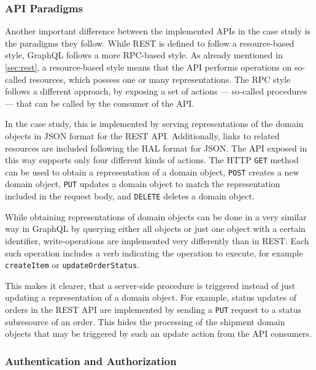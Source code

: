 \subsubsection{\acs{API} Paradigms}

Another important difference between the implemented \acp{API} in the case study is the paradigms they follow.
While \ac{REST} is defined to follow a resource-based style, GraphQL follows a more \ac{RPC}-based style.
As already mentioned in \autoref{sec:rest}, a resource-based style means that the \ac{API} performs operations on so-called resources, which possess one or many representations.
The \ac{RPC} style follows a different approach, by exposing a set of actions --- so-called procedures --- that can be called by the consumer of the \ac{API}.

In the case study, this is implemented by serving representations of the domain objects in \ac{JSON} format for the \ac{REST} \ac{API}.
Additionally, links to related resources are included following the \ac{HAL} format for \ac{JSON}.
The \ac{API} exposed in this way supports only four different kinds of actions.
The \ac{HTTP} \texttt{GET} method can be used to obtain a representation of a domain object, \texttt{POST} creates a new domain object, \texttt{PUT} updates a domain object to match the representation included in the request body, and \texttt{DELETE} deletes a domain object.

While obtaining representations of domain objects can be done in a very similar way in GraphQL by querying either all objects or just one object with a certain identifier, write-operations are implemented very differently than in \ac{REST}.
Each such operation includes a verb indicating the operation to execute, for example \texttt{createItem} or \texttt{updateOrderStatus}.

This makes it clearer, that a server-side procedure is triggered instead of just updating a representation of a domain object.
For example, status updates of orders in the \ac{REST} \ac{API} are implemented by sending a \texttt{PUT} request to a status subresource of an order.
This hides the processing of the shipment domain objects that may be triggered by such an update action from the \ac{API} consumers.

\subsubsection{Authentication and Authorization}

